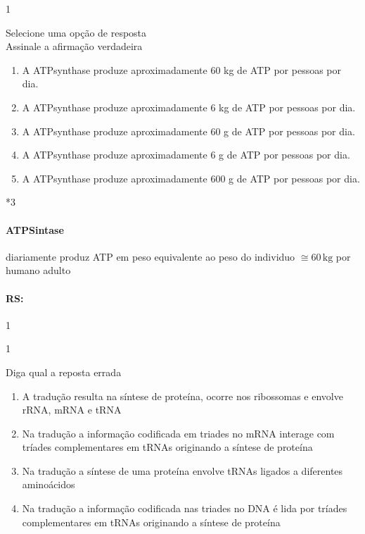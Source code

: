 \documentclass[\mainfilename]{subfiles}
\begin{document}
\begin{questionBox}1{}

    Selecione uma opção de resposta\\
    
    Assinale a afirmação verdadeira
    \begin{enumerate}
        \item A ATPsynthase produze aproximadamente 60 kg de ATP por pessoas por dia.
        \item A ATPsynthase produze aproximadamente 6 kg de ATP por pessoas por dia.
        \item A ATPsynthase produze aproximadamente 60 g de ATP por pessoas por dia.
        \item A ATPsynthase produze aproximadamente 6 g de ATP por pessoas por dia.
        \item A ATPsynthase produze aproximadamente 600 g de ATP por pessoas por dia.
    \end{enumerate}

    \begin{questionBox}*3{}
        
        \paragraph{ATPSintase} diariamente produz ATP em peso equivalente ao peso do individuo \(\cong 60\,\unit{\kilo\gram}\) por humano adulto
        
    \end{questionBox}

    \paragraph{RS:} 1
    
\end{questionBox}

\begin{questionBox}1{}
    
    Diga qual a reposta {\color{red\Light}errada}
    \begin{enumerate}
        \item A tradução resulta na síntese de proteína, ocorre nos ribossomas e envolve rRNA, mRNA e tRNA
        \item Na tradução a informação codificada em triades no mRNA  interage com tríades complementares  em  tRNAs originando a  síntese de proteína
        \item Na tradução a síntese de uma proteína envolve  tRNAs  ligados a diferentes aminoácidos 
        \item Na tradução a informação codificada nas triades no DNA é lida por tríades complementares  em   tRNAs  originando a síntese de proteína 
    \end{enumerate}


    
\end{questionBox}
\end{document}
